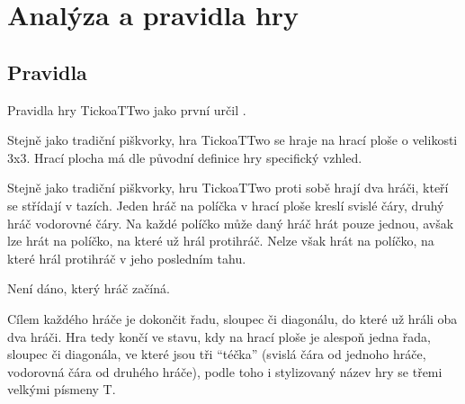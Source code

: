 \chapter{Analýza a pravidla hry}

\section{Pravidla}
Pravidla hry TickoaTTwo jako první určil \textcite{jenkins22}.

Stejně jako tradiční piškvorky, hra TickoaTTwo se hraje na hrací ploše o velikosti 3x3. Hrací plocha má dle původní definice hry specifický vzhled.



Stejně jako tradiční piškvorky, hru TickoaTTwo proti sobě hrají dva hráči,
kteří se střídají v tazích. Jeden hráč na políčka v hrací ploše kreslí svislé
čáry, druhý hráč vodorovné čáry. Na každé políčko může daný hráč hrát pouze
jednou, avšak lze hrát na políčko, na které už hrál protihráč. Nelze však hrát
na políčko, na které hrál protihráč v jeho posledním tahu.

Není dáno, který hráč začíná.

Cílem každého hráče je dokončit řadu, sloupec či diagonálu, do které už hráli
oba dva hráči. Hra tedy končí ve stavu, kdy na hrací ploše je alespoň jedna
řada, sloupec či diagonála, ve které jsou tři \enquote{téčka} (svislá čára od
jednoho hráče, vodorovná čára od druhého hráče), podle toho i stylizovaný název
hry se třemi velkými písmeny T.


